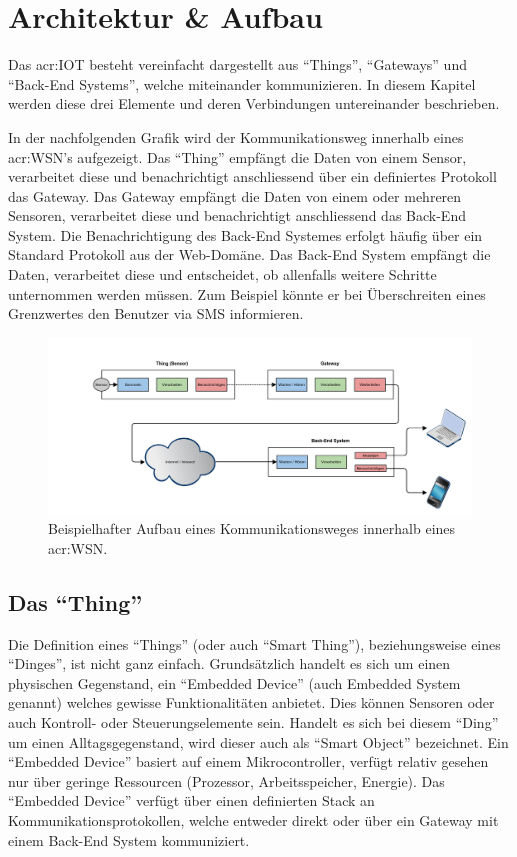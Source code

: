 \section{Architektur \& Aufbau}
Das \gls{acr:IOT} besteht vereinfacht dargestellt aus "`Things"', "`Gateways"' und "`Back-End Systems"', welche miteinander kommunizieren. In diesem Kapitel werden diese drei Elemente und deren Verbindungen untereinander beschrieben.

In der nachfolgenden Grafik wird der Kommunikationsweg innerhalb eines \gls{acr:WSN}'s aufgezeigt. Das "`Thing"' empfängt die Daten von einem Sensor, verarbeitet diese und benachrichtigt anschliessend über ein definiertes Protokoll das Gateway. Das Gateway empfängt die Daten von einem oder mehreren Sensoren, verarbeitet diese und benachrichtigt anschliessend das Back-End System. Die Benachrichtigung des Back-End Systemes erfolgt häufig über ein Standard Protokoll aus der Web-Domäne. Das Back-End System empfängt die Daten, verarbeitet diese und entscheidet, ob allenfalls weitere Schritte unternommen werden müssen. Zum Beispiel könnte er bei Überschreiten eines Grenzwertes den Benutzer via SMS informieren.

\begin{figure}[!h]
  \centering
  \includegraphics[width=16cm]{./images/Node-Gateway-BackEnd}
  \caption{Beispielhafter Aufbau eines Kommunikationsweges innerhalb eines \gls{acr:WSN}.}
\end{figure}

\subsection{Das "`Thing"'}
Die Definition eines "`Things"' (oder auch "`Smart Thing"'), beziehungsweise eines "`Dinges"', ist nicht ganz einfach. Grundsätzlich handelt es sich um einen physischen Gegenstand, ein "`Embedded Device"' (auch Embedded System genannt) welches gewisse Funktionalitäten anbietet. Dies können Sensoren oder auch Kontroll- oder Steuerungselemente sein. Handelt es sich bei diesem "`Ding"' um einen Alltagsgegenstand, wird dieser auch als "`Smart Object"' bezeichnet. Ein "`Embedded Device"' basiert auf einem Mikrocontroller, verfügt relativ gesehen nur über geringe Ressourcen (Prozessor, Arbeitsspeicher, Energie). Das "`Embedded Device"' verfügt über einen definierten Stack an Kommunikationsprotokollen, welche entweder direkt oder über ein Gateway mit einem Back-End System kommuniziert. 

